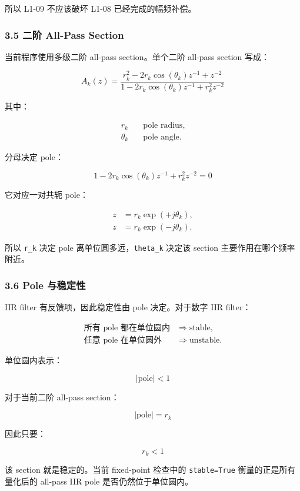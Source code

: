 \documentclass[
]{ctexart}
\begin{document}
所以 L1-09 不应该破坏 L1-08 已经完成的幅频补偿。

\subsubsection{3.5 二阶 All-Pass
Section}\label{ux4e8cux9636-all-pass-section}

当前程序使用多级二阶 all-pass section。单个二阶 all-pass section 写成：

\[
A_k(z)=
\frac{r_k^2-2r_k\cos(\theta_k)z^{-1}+z^{-2}}
{1-2r_k\cos(\theta_k)z^{-1}+r_k^2z^{-2}}
\]

其中：

\[
\begin{aligned}
r_k &\quad \text{pole radius},\\
\theta_k &\quad \text{pole angle}.
\end{aligned}
\]

分母决定 pole：

\[
1-2r_k\cos(\theta_k)z^{-1}+r_k^2z^{-2}=0
\]

它对应一对共轭 pole：

\[
\begin{aligned}
z &= r_k\exp(+j\theta_k),\\
z &= r_k\exp(-j\theta_k).
\end{aligned}
\]

所以 \texttt{r\_k} 决定 pole 离单位圆多远，\texttt{theta\_k} 决定该
section 主要作用在哪个频率附近。

\subsubsection{3.6 Pole 与稳定性}\label{pole-ux4e0eux7a33ux5b9aux6027}

IIR filter 有反馈项，因此稳定性由 pole 决定。对于数字 IIR filter：

\[
\begin{aligned}
\text{所有 pole 都在单位圆内} &\Rightarrow \text{stable},\\
\text{任意 pole 在单位圆外} &\Rightarrow \text{unstable}.
\end{aligned}
\]

单位圆内表示：

\[
|\mathrm{pole}|<1
\]

对于当前二阶 all-pass section：

\[
|\mathrm{pole}|=r_k
\]

因此只要：

\[
r_k<1
\]

该 section 就是稳定的。当前 fixed-point 检查中的 \texttt{stable=True}
衡量的正是所有量化后的 all-pass IIR pole 是否仍然位于单位圆内。
\end{document}
